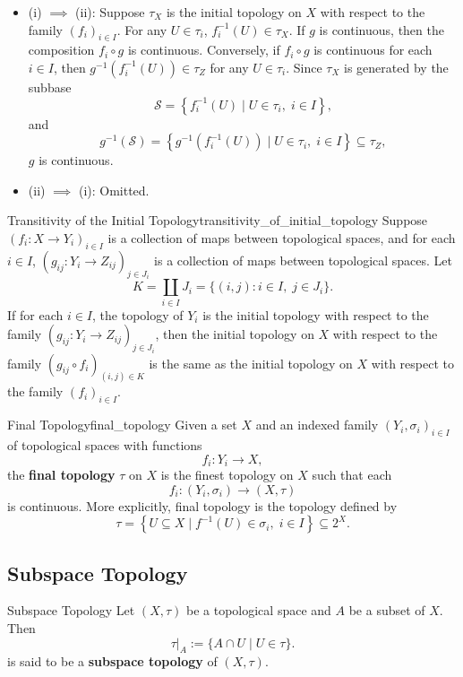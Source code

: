 \documentclass{report}
\begin{document}
\begin{prf}
	\phantom{.} 
	\begin{itemize}[leftmargin=*]
		\item (i) $\implies$ (ii): Suppose $\tau_X$ is the initial topology on $X$ with respect to the family $\left(f_i\right)_{i \in I}$. For any $U\in \tau_i$, $f_i^{-1}(U)\in \tau_X$. If $g$ is continuous, then the composition $f_i\circ g$ is continuous. Conversely, if $f_i\circ g$ is continuous for each $i \in I$, then $g^{-1}(f_i^{-1}(U))\in \tau_Z$ for any $U\in \tau_i$. Since $\tau_X$ is generated by the subbase
		\[
		\mathcal{S}=\left\{ f_i^{-1}(U) \mid U\in \tau_i, \;i \in I \right\},
		\]
		and 
		\[
		g^{-1}\left(\mathcal{S}\right)=\left\{ g^{-1}(f_i^{-1}(U)) \mid U\in \tau_i, \;i \in I \right\} \subseteq \tau_Z,
		\]
		$g$ is continuous.
		\item (ii) $\implies$ (i): Omitted.
	\end{itemize}
\end{prf}

\begin{proposition}{Transitivity of the Initial Topology}{transitivity_of_initial_topology}
	Suppose $\left(f_i: X \to Y_i\right)_{i \in I}$ is a collection of maps between topological spaces, and for each $i\in I$, $\left(g_{ij}: Y_i \to Z_{ij}\right)_{j\in J_i}$ is a collection of maps between topological spaces. Let
	\[
		K = \coprod_{i\in I} J_i = \{ (i,j) : i\in I,\; j\in J_i \}.
	\]
	If for each $i\in I$, the topology of $Y_i$ is the initial topology with respect to the family $\left(g_{ij}: Y_i \to Z_{ij}\right)_{j\in J_i}$, then the initial topology on $X$ with respect to the family $\left(g_{ij}\circ f_i\right)_{(i,j)\in K}$ is the same as the initial topology on $X$ with respect to the family $\left(f_i\right)_{i \in I}$.
\end{proposition}

\begin{definition}{Final Topology}{final_topology}
	Given a set $X$ and an indexed family $\left(Y_i, \sigma_i\right)_{i \in I}$ of topological spaces with functions
	$$
	f_i: Y_i \rightarrow X,
	$$
	the \textbf{final topology} $\tau$ on $X$ is the finest topology on $X$ such that each
	$$
	f_i:(Y_i, \sigma_i) \rightarrow (X, \tau)
	$$
	is continuous. More explicitly, final topology is the topology defined by
	\[
		\tau=\left\{ U\subseteq X \mid f^{-1}(U)\in \sigma_i, \;i \in I \right\}\subseteq 2^X.
	\]
\end{definition}

\subsection{Subspace Topology}
\begin{definition}{Subspace Topology}{}
	Let $(X,\tau)$ be a topological space and $A$ be a subset of $X$. Then
	\[
		\tau |_A:=\{A\cap U\mid U\in \tau\}.
	\]
	is said to be a \textbf{subspace topology} of $(X,\tau)$.
\end{definition}
\end{document}
